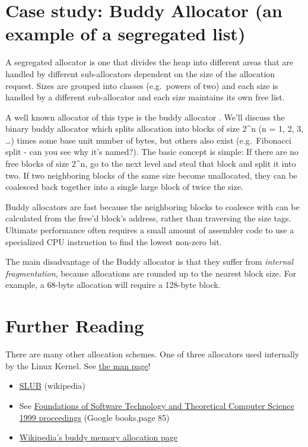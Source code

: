 \section{Case study: Buddy Allocator (an example of a segregated list)}

A segregated allocator is one that divides the heap into different areas that are handled by different sub-allocators dependent on the size of the allocation request. Sizes are grouped into classes (e.g.~powers of two) and each size is handled by a different sub-allocator and each size maintains its own free list.

A well known allocator of this type is the buddy allocator \cite[P. 85]{rangan1999foundations}. We'll discuss the binary buddy allocator which splits allocation into blocks of size 2\^{}n (n = 1, 2, 3, \ldots{}) times some base unit number of bytes, but others also exist (e.g.~Fibonacci split - can you see why it's named?). The basic concept is simple: If there are no free blocks of size 2\^{}n, go to the next level and steal that block and split it into two. If two neighboring blocks of the same size become unallocated, they can be coalesced back together into a single large block of twice the size.

Buddy allocators are fast because the neighboring blocks to coalesce with can be calculated from the free'd block's address, rather than traversing the size tags. Ultimate performance often requires a small amount of assembler code to use a specialized CPU instruction to find the lowest non-zero bit.

The main disadvantage of the Buddy allocator is that they suffer from \emph{internal fragmentation}, because allocations are rounded up to the nearest block size. For example, a 68-byte allocation will require a 128-byte block.

\section{Further Reading}

There are many other allocation schemes. One of three allocators used internally by the Linux Kernel. See \href{http://man7.org/linux/man-pages/man3/malloc.3.html}{the man page}!

\begin{itemize}
\tightlist
\item
  \href{http://en.wikipedia.org/wiki/SLUB_\%28software\%29}{SLUB} (wikipedia)
\item
  See \href{http://books.google.com/books?id=0uHME7EfjQEC\&lpg=PP1\&pg=PA85\#v=onepage\&q\&f=false}{Foundations of Software Technology and Theoretical Computer Science 1999 proceedings} (Google books,page 85)
\item
  \href{http://en.wikipedia.org/wiki/Buddy_memory_allocation}{Wikipedia's buddy memory allocation page}
\end{itemize}

